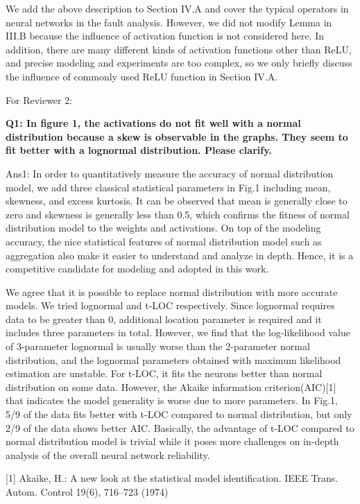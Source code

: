 We add the above description to Section IV.A and cover the typical operators in neural networks in the fault analysis. However, we did not modify Lemma in III.B because the influence of activation function is not considered here. In addition, there are many different kinds of activation functions other than ReLU, and precise modeling and experiments are too complex, so we only briefly discuss the influence of commonly used ReLU function in Section IV.A.

For Reviewer 2:

\textbf{Q1: In figure 1, the activations do not fit well with a normal distribution because a skew is observable in the graphs. They seem to fit better with a lognormal distribution. Please clarify.} 

Ans1: In order to quantitatively measure the accuracy of normal distribution model, we add three classical statistical parameters in Fig.1 including mean, skewness, and excess kurtosis. It can be observed that mean is generally close to zero and skewness is generally less than 0.5, which confirms the fitness of normal distribution model to the weights and activations. On top of the modeling accuracy, the nice statistical features of normal distribution model such as aggregation also make it easier to understand and analyze in depth. Hence, it is a competitive candidate for modeling and adopted in this work. 

We agree that it is possible to replace normal distribution with more accurate models. We tried lognormal and t-LOC respectively. Since lognormal requires data to be greater than 0, additional location parameter is required and it includes three parameters in total. However, we find that the log-likelihood value of 3-parameter lognormal is usually worse than the 2-parameter normal distribution, and the lognormal parameters obtained with maximum likelihood estimation are unstable. For t-LOC, it fits the neurons better than normal distribution on some data. However, the Akaike information criterion(AIC)[1] that indicates the model generality is worse due to more parameters. In Fig.1, 5/9 of the data fits better with t-LOC compared to normal distribution, but only 2/9 of the data shows better AIC. Basically, the advantage of t-LOC compared to normal distribution model is trivial while it poses more challenges on in-depth analysis of the overall neural network reliability.

[1] Akaike, H.: A new look at the statistical model identification. IEEE Trans. Autom. Control 19(6), 716–723 (1974)

